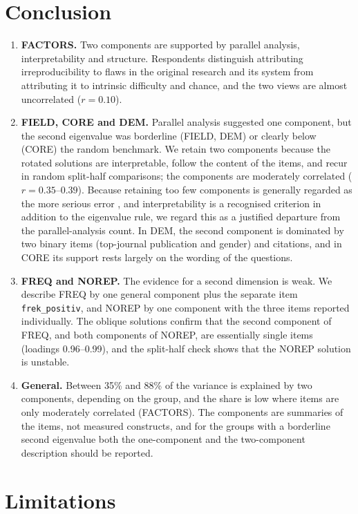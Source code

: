 \documentclass[11pt,a4paper]{article}
\newcommand{\var}[1]{\texttt{#1}}
\begin{document}
\section{Conclusion}

\begin{enumerate}
\item \textbf{FACTORS.} Two components are supported by parallel analysis, interpretability and structure. Respondents distinguish attributing irreproducibility to flaws in the original research and its system from attributing it to intrinsic difficulty and chance, and the two views are almost uncorrelated ($r=0.10$).
\item \textbf{FIELD, CORE and DEM.} Parallel analysis suggested one component, but the second eigenvalue was borderline (FIELD, DEM) or clearly below (CORE) the random benchmark. We retain two components because the rotated solutions are interpretable, follow the content of the items, and recur in random split-half comparisons; the components are moderately correlated ($r=0.35$--$0.39$). Because retaining too few components is generally regarded as the more serious error \citep{fabrigar1999}, and interpretability is a recognised criterion in addition to the eigenvalue rule, we regard this as a justified departure from the parallel-analysis count. In DEM, the second component is dominated by two binary items (top-journal publication and gender) and citations, and in CORE its support rests largely on the wording of the questions.
\item \textbf{FREQ and NOREP.} The evidence for a second dimension is weak. We describe FREQ by one general component plus the separate item \var{frek\_positiv}, and NOREP by one component with the three items reported individually. The oblique solutions confirm that the second component of FREQ, and both components of NOREP, are essentially single items (loadings 0.96--0.99), and the split-half check shows that the NOREP solution is unstable.
\item \textbf{General.} Between 35\% and 88\% of the variance is explained by two components, depending on the group, and the share is low where items are only moderately correlated (FACTORS). The components are summaries of the items, not measured constructs, and for the groups with a borderline second eigenvalue both the one-component and the two-component description should be reported.
\end{enumerate}

\section{Limitations}
\end{document}
